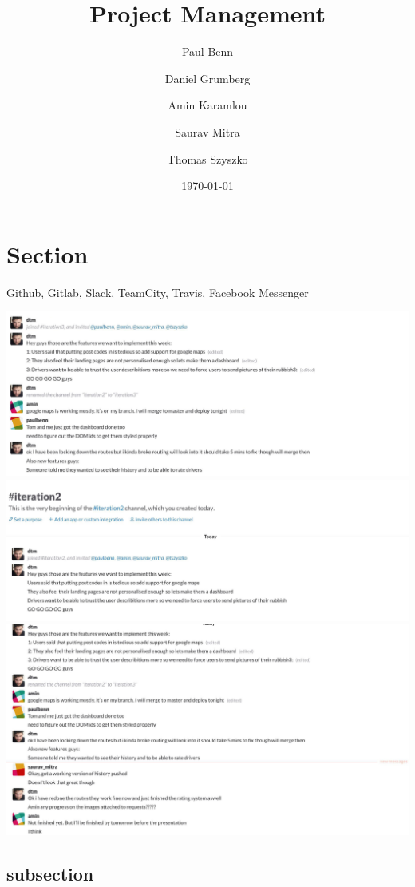 \documentclass[a4wide, 11pt]{article}
\begin{document}
\title{Project Management}

\author{Paul Benn \and Daniel Grumberg \and Amin Karamlou \and Saurav Mitra \and Thomas Szyszko }

\date{\today}

\maketitle

\clearpage

\section{Section}

Github, Gitlab, Slack, TeamCity, Travis, Facebook Messenger

\includegraphics{slack1}
\includegraphics{slack2}
\includegraphics{slack3}

\subsection{subsection} 
\end{document}
